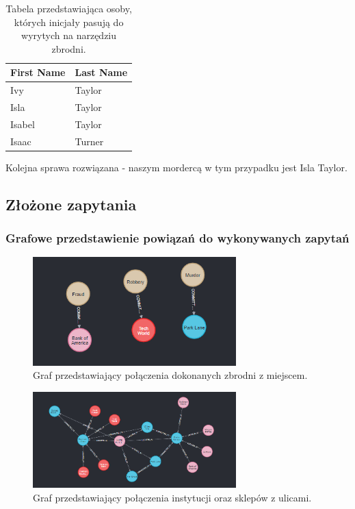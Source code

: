 \documentclass[a4paper,12pt]{article}
\begin{document}
\begin{table}[h!]
\centering
\begin{tabular}{|l|l|}
\hline
\textbf{First Name} & \textbf{Last Name} \\ \hline
Ivy                & Taylor             \\ \hline
Isla               & Taylor             \\ \hline
Isabel             & Taylor             \\ \hline
Isaac              & Turner             \\ \hline
\end{tabular}
\caption{Tabela przedstawiająca osoby, których inicjały pasują do wyrytych na narzędziu zbrodni.}
\label{tab:names}
\end{table}
\newpage

Kolejna sprawa rozwiązana - naszym mordercą w tym przypadku jest Isla Taylor.

\subsection{Złożone zapytania}

\subsubsection{Grafowe przedstawienie powiązań do wykonywanych zapytań}

\begin{figure}[h!]
    \centering
    \includegraphics[width=0.7\textwidth]{commited_at.png}
    \caption{Graf przedstawiający połączenia dokonanych zbrodni z miejscem.}
    \label{fig:commited_at}
\end{figure}

\begin{figure}[h!]
    \centering
    \includegraphics[width=0.7\textwidth]{located_at.png}
    \caption{Graf przedstawiający połączenia instytucji oraz sklepów z ulicami.}
    \label{fig:located_at}
\end{figure}
\end{document}

